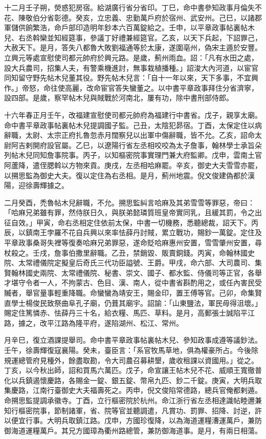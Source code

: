 \begin{pinyinscope}
 十二月壬子朔，熒惑犯房宿。給湖廣行省分省印。丁巳，命中書參知政事月倫失不花、陳敬伯分省彰德。癸亥，立忠義、忠勤萬戶府於宿州、武安州。己巳，以諸郡軍儲供餉繁浩，命戶部印造明年鈔本六百萬錠給之。壬申，以平章政事帖裏帖木兒、右丞斡欒並知經筵事，參議丁好禮兼經筵官。乙亥，以天下兵起，下詔罪己，大赦天下。是月，答失八都魯大敗劉福通等於太康，遂圍亳州，偽宋主遁於安豐。立興元等處宣慰使司都元帥府於興元路。是歲，薊州雨血。詔：「凡有水田之處，設大兵農司，招集人夫，有警乘機進討，無事栽植播種。」詔浚大內河道，以宦官同知留守野先帖木兒董其役。野先帖木兒言：「自十一年以來，天下多事，不宜興作。」帝怒，命往使高麗，改命宦官答失蠻董之。以中書平章政事拜住分省濟寧，設四部。是歲，察罕帖木兒與賊戰於河南北，屢有功，除中書刑部侍郎。



 十六年春正月壬午，改福建宣慰使司都元帥府為福建行中書省。戊子，親享太廟。命中書平章政事帖裏帖木兒提調國子監。己丑，太陰犯昴宿。丁酉，太保定住以病辭職，太尉、太宗正府扎魯忽赤月闊察兒以出軍中傷辭職，皆不允。乙亥，詔命太尉阿吉剌開府設官屬。乙巳，以遼陽行省左丞相咬咬為太子詹事，翰林學士承旨朵列帖木兒同知詹事院事。丙子，以知樞密院事實理門兼大府監卿。戊申，雲南土官阿蘆降，遣侄腮斡以方物來貢。庚戌，左丞相哈麻罷。辛亥，御史大夫雪雪亦罷，以搠思監為御史大夫。復以定住為右丞相。是月，薊州地震。倪文俊建偽都於漢陽，迎徐壽輝據之。



 二月癸酉，禿魯帖木兒辭職，不允。搠思監糾言哈麻及其弟雪雪等罪惡，帝曰：「哈麻兄弟雖有罪，然侍朕日久，與朕弟懿璘質班皇帝實同乳，且緩其罰，令之出征自效。」甲寅，命右丞相定住依前太保，中書一切機務，悉聽總裁，詔天下。丙辰，以鎮南王孛羅不花自兵興以來率怯薛丹討賊，累立戰功，賜鈔一萬錠。定住及平章政事桑哥失裡等復奏哈麻兄弟罪惡，遂命貶哈麻惠州安置，雪雪肇州安置，尋杖殺之。壬戌，詹事伯撒里辭職。乙丑，禁銷毀、販賣銅錢。丙寅，命翰林國史院、太常禮儀院定擬皇后奇氏三代功臣謚號、王爵。甲戌，命六部、大司農司、集賢翰林國史兩院、太常禮儀院、秘書、崇文、國子、都水監、侍儀司等正官，各舉才堪守令者一人，不拘蒙古、色目、漢、南人，從中書省斟酌用之，或任內害民受贓者，舉官量事輕重降職。命蠻蠻為靖安王，賜金印，置王傅等官。己卯，命集賢直學士楊俊民致祭曲阜孔子廟，仍葺其廟宇。詔諭：「山東鹽法，軍民毋得沮壞。」賜定住篤憐赤、怯薛丹三十名，給衣糧、馬匹、草料。是月，高郵張士誠陷平江路，據之，改平江路為隆平府，遂陷湖州、松江、常州。



 月辛巳，復立酒課提舉司。命中書平章政事帖裏帖木兒、參知政事成遵等議鈔法。壬午，徐壽輝復寇襄陽。癸未，臺臣言：「系官牧馬草地，俱為權豪所占。今後除規運總管府見種外，餘盡取勘，令大司農召募耕墾，歲收租課以資國用。」從之。丁亥，以今秋出師，詔和買馬六萬匹。戊子，命宣讓王帖木兒不花、威順王寬徹普化以兵鎮遏懷慶路，各賜金一錠、銀五錠、幣帛九匹、鈔二千錠。庚寅，大明兵取集慶路，江南行臺御史大夫福壽死之。丙申，倪文俊陷常德路，總兵官俺都剌遁。命搠思監提調承徽寺。丁酉，立行樞密院於杭州。命江浙行省左丞相達識帖睦邇兼知行樞密院事，節制諸軍，省、院等官並聽調遣，凡賞功、罰罪、招降、討逆，許以便宜行事。大明兵取鎮江路。戊申，方國珍復降，以為海道運糧漕運萬戶，兼防御海道運糧萬戶。其兄方國璋為衢州路總管，兼防御海道事。是月，有兩日相蕩。




\end{pinyinscope}
